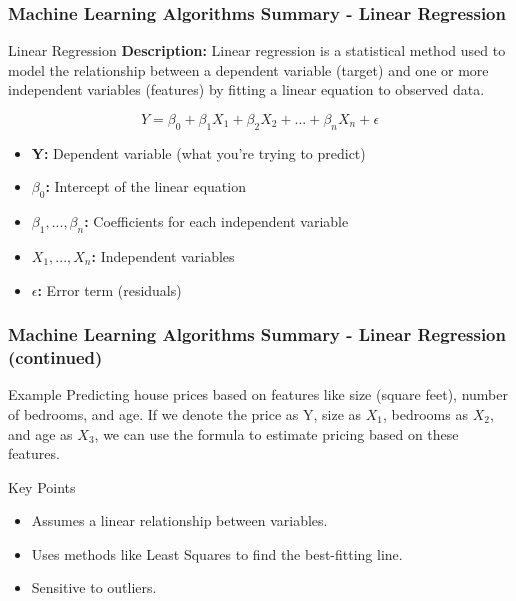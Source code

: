 \documentclass[aspectratio=169]{beamer}
\begin{document}
\begin{frame}[fragile]
    \frametitle{Machine Learning Algorithms Summary - Linear Regression}
    \begin{block}{Linear Regression}
        \textbf{Description:} Linear regression is a statistical method used to model the relationship between 
        a dependent variable (target) and one or more independent variables (features) by fitting a linear 
        equation to observed data.
    \end{block}
    
    \begin{equation}
    Y = \beta_0 + \beta_1X_1 + \beta_2X_2 + ... + \beta_nX_n + \epsilon
    \end{equation}
    \begin{itemize}
        \item \textbf{Y:} Dependent variable (what you're trying to predict)
        \item \textbf{$\beta_0$:} Intercept of the linear equation
        \item \textbf{$\beta_1,...,\beta_n$:} Coefficients for each independent variable
        \item \textbf{$X_1,...,X_n$:} Independent variables 
        \item \textbf{$\epsilon$:} Error term (residuals)
    \end{itemize}
\end{frame}

\begin{frame}[fragile]
    \frametitle{Machine Learning Algorithms Summary - Linear Regression (continued)}
    \begin{block}{Example}
        Predicting house prices based on features like size (square feet), 
        number of bedrooms, and age. If we denote the price as Y, size as 
        $X_1$, bedrooms as $X_2$, and age as $X_3$, we can use the formula 
        to estimate pricing based on these features.
    \end{block}
    \begin{block}{Key Points}
        \begin{itemize}
            \item Assumes a linear relationship between variables.
            \item Uses methods like Least Squares to find the best-fitting line.
            \item Sensitive to outliers.
        \end{itemize}
    \end{block}
\end{frame}
\end{document}
